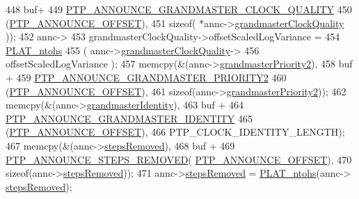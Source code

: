\begin{DoxyCode}
{{{{{{{{448                 buf+
449                 \hyperlink{avbts__message_8hpp_a972816df3b21a89930e21ac6a9617408}{PTP\_ANNOUNCE\_GRANDMASTER\_CLOCK\_QUALITY}
450                 (\hyperlink{avbts__message_8hpp_aaa3da4fa4e9e4cfe49477cd7f6b95bca}{PTP\_ANNOUNCE\_OFFSET}),
451                 \textcolor{keyword}{sizeof}( *annc->\hyperlink{class_p_t_p_message_announce_aa67cf6cb88ed67b2850993312a7cd5f2}{grandmasterClockQuality} ));
452             annc->
453               grandmasterClockQuality->offsetScaledLogVariance =
454               \hyperlink{linux_2src_2platform_8cpp_a6b8f3e7b87b66fa774a07ddc67f883a7}{PLAT\_ntohs}
455               ( annc->\hyperlink{class_p_t_p_message_announce_aa67cf6cb88ed67b2850993312a7cd5f2}{grandmasterClockQuality}->
456                 offsetScaledLogVariance );
457             memcpy(&(annc->\hyperlink{class_p_t_p_message_announce_a1e9e3c7867bf9eb557e5cf6edbd7f54a}{grandmasterPriority2}),
458                    buf +
459                    \hyperlink{avbts__message_8hpp_ad08230d0bcb3b40a12153ace07e585f9}{PTP\_ANNOUNCE\_GRANDMASTER\_PRIORITY2}
460                    (\hyperlink{avbts__message_8hpp_aaa3da4fa4e9e4cfe49477cd7f6b95bca}{PTP\_ANNOUNCE\_OFFSET}),
461                    \textcolor{keyword}{sizeof}(annc->\hyperlink{class_p_t_p_message_announce_a1e9e3c7867bf9eb557e5cf6edbd7f54a}{grandmasterPriority2}));
462             memcpy(&(annc->\hyperlink{class_p_t_p_message_announce_aac45d13272e7f5bd9b06d2bf44c012af}{grandmasterIdentity}),
463                    buf +
464                    \hyperlink{avbts__message_8hpp_a822a74880e223c13025df7bbfa545b63}{PTP\_ANNOUNCE\_GRANDMASTER\_IDENTITY}
465                    (\hyperlink{avbts__message_8hpp_aaa3da4fa4e9e4cfe49477cd7f6b95bca}{PTP\_ANNOUNCE\_OFFSET}),
466                    PTP\_CLOCK\_IDENTITY\_LENGTH);
467             memcpy(&(annc->\hyperlink{class_p_t_p_message_announce_ab24df4cccbede4b07586878ef0d47395}{stepsRemoved}),
468                    buf +
469                    \hyperlink{avbts__message_8hpp_ad9e2d7ce4d1384fad376314924fa4cea}{PTP\_ANNOUNCE\_STEPS\_REMOVED}(
      \hyperlink{avbts__message_8hpp_aaa3da4fa4e9e4cfe49477cd7f6b95bca}{PTP\_ANNOUNCE\_OFFSET}),
470                    \textcolor{keyword}{sizeof}(annc->\hyperlink{class_p_t_p_message_announce_ab24df4cccbede4b07586878ef0d47395}{stepsRemoved}));
471             annc->\hyperlink{class_p_t_p_message_announce_ab24df4cccbede4b07586878ef0d47395}{stepsRemoved} = \hyperlink{linux_2src_2platform_8cpp_a6b8f3e7b87b66fa774a07ddc67f883a7}{PLAT\_ntohs}(annc->
      \hyperlink{class_p_t_p_message_announce_ab24df4cccbede4b07586878ef0d47395}{stepsRemoved});
}}}}}}}}
\end{DoxyCode}
